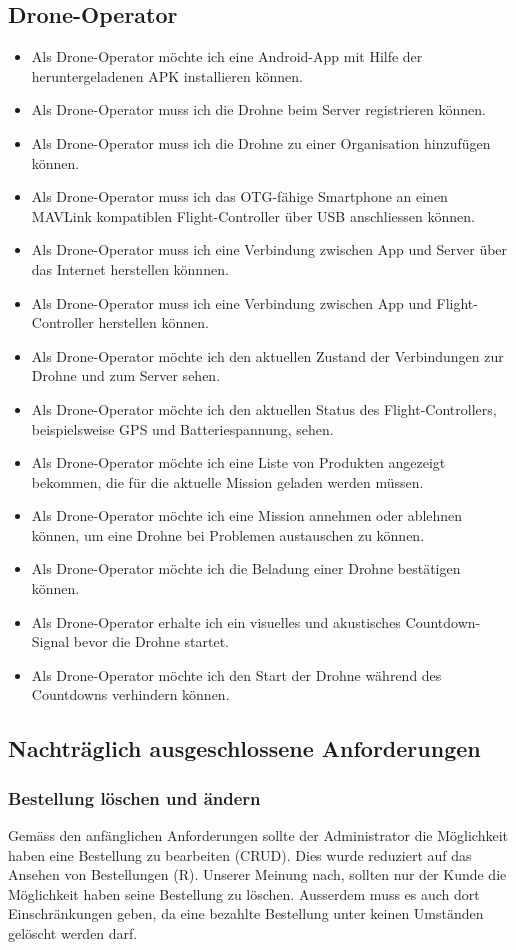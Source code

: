 \subsection{Drone-Operator}
\begin{itemize}
	\item Als Drone-Operator möchte ich eine Android-App mit Hilfe der heruntergeladenen \Gls{APK} installieren können.
	\item Als Drone-Operator muss ich die Drohne beim Server registrieren können.
	\item Als Drone-Operator muss ich die Drohne zu einer Organisation hinzufügen können.
	\item Als Drone-Operator muss ich das \Gls{OTG}-fähige Smartphone an einen \Gls{MAVLink} kompatiblen \Gls{Flight-Controller} über USB anschliessen können.
	\item Als Drone-Operator muss ich eine Verbindung zwischen App und Server über das Internet herstellen könnnen.
	\item Als Drone-Operator muss ich eine Verbindung zwischen App und \Gls{Flight-Controller} herstellen können.
	\item Als Drone-Operator möchte ich den aktuellen Zustand der Verbindungen zur Drohne und zum Server sehen.
	\item Als Drone-Operator möchte ich den aktuellen Status des \Gls{Flight-Controller}s, beispielsweise GPS und Batteriespannung, sehen.
	\item Als Drone-Operator möchte ich eine Liste von Produkten angezeigt bekommen, die für die aktuelle Mission geladen werden müssen.
	\item Als Drone-Operator möchte ich eine Mission annehmen oder ablehnen können, um eine Drohne bei Problemen austauschen zu können.
	\item Als Drone-Operator möchte ich die Beladung einer Drohne bestätigen können.
	\item Als Drone-Operator erhalte ich ein visuelles und akustisches Countdown-Signal bevor die Drohne startet.
	\item Als Drone-Operator möchte ich den Start der Drohne während des Countdowns verhindern können.
\end{itemize}

\subsection{Nachträglich ausgeschlossene Anforderungen}

\subsubsection{Bestellung löschen und ändern}
Gemäss den anfänglichen Anforderungen sollte der Administrator die Möglichkeit haben eine Bestellung zu bearbeiten (\Gls{CRUD}). Dies wurde reduziert auf das Ansehen von Bestellungen (R). Unserer Meinung nach, sollten nur der Kunde die Möglichkeit haben seine Bestellung zu löschen. Ausserdem muss es auch dort Einschränkungen geben, da eine bezahlte Bestellung unter keinen Umständen gelöscht werden darf.

